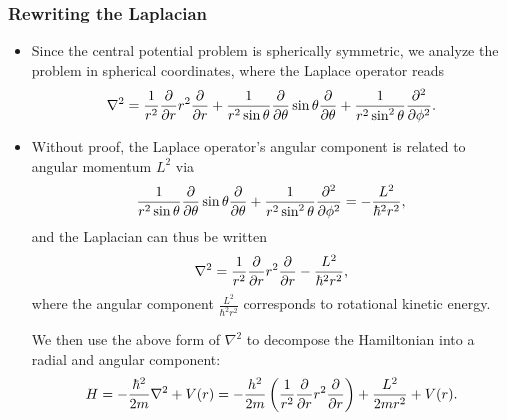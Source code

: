 \documentclass[11pt, a4paper]{article}
\renewcommand{\laplacian}{\nabla^{2}}
\newcommand{\Ham}{Hamiltonian\xspace}
\begin{document}
\subsubsection{Rewriting the Laplacian}
\begin{itemize}
	\item Since the central potential problem is spherically symmetric, we analyze the problem in spherical coordinates, where the Laplace operator reads
	\begin{equation*}
		\laplacian = \frac{1}{r^{2}}\pdv{r}r^{2}\pdv{r} + \frac{1}{r^{2}\sin \theta}\pdv{\theta}\sin \theta \pdv{\theta} + \frac{1}{r^{2}\sin^{2}\theta} \pdv[2]{}{\phi}.
	\end{equation*}

	\item Without proof, the Laplace operator's angular component is related to angular momentum $ L^{2} $ via
	\begin{equation*}
		 \frac{1}{r^{2}\sin \theta}\pdv{\theta}\sin \theta \pdv{\theta} + \frac{1}{r^{2}\sin^{2}\theta} \pdv[2]{}{\phi} = -\frac{L^{2}}{\hbar^{2}r^{2}},
	\end{equation*}
	and the Laplacian can thus be written
	\begin{equation*}
		\laplacian = \frac{1}{r^{2}}\pdv{r}r^{2}\pdv{r} -\frac{L^{2}}{\hbar^{2}r^{2}},
	\end{equation*} 
	where the angular component $ \frac{L^{2}}{\hbar^{2}r^{2}} $ corresponds to rotational kinetic energy.
	
    We then use the above form of $ \laplacian $ to decompose the \Ham into a radial and angular component:
	\begin{equation*}
		H = -\frac{\hbar^{2}}{2m}\laplacian + V(r) = - \frac{h^{2}}{2m} \left(\frac{1}{r^{2}} \pdv{r}r^{2} \pdv{r}\right) + \frac{L^{2}}{2mr^{2}} + V(r).
	\end{equation*}
	
\end{itemize}
\end{document}
